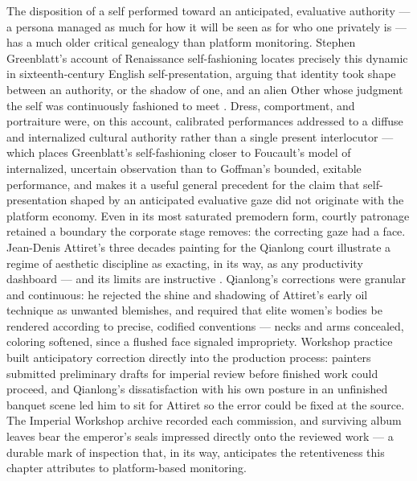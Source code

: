\documentclass[10pt]{article}
\begin{document}
The disposition of a self performed toward an anticipated, evaluative authority --- a persona managed as much for how it will be seen as for who one privately is --- has a much older critical genealogy than platform monitoring. Stephen Greenblatt's account of Renaissance self-fashioning locates precisely this dynamic in sixteenth-century English self-presentation, arguing that identity took shape between an authority, or the shadow of one, and an alien Other whose judgment the self was continuously fashioned to meet \cite{greenblatt}. Dress, comportment, and portraiture were, on this account, calibrated performances addressed to a diffuse and internalized cultural authority rather than a single present interlocutor --- which places Greenblatt's self-fashioning closer to Foucault's model of internalized, uncertain observation than to Goffman's bounded, exitable performance, and makes it a useful general precedent for the claim that self-presentation shaped by an anticipated evaluative gaze did not originate with the platform economy. Even in its most saturated premodern form, courtly patronage retained a boundary the corporate stage removes: the correcting gaze had a face. Jean-Denis Attiret's three decades painting for the Qianlong court illustrate a regime of aesthetic discipline as exacting, in its way, as any productivity dashboard --- and its limits are instructive \cite{kleutghen}. Qianlong's corrections were granular and continuous: he rejected the shine and shadowing of Attiret's early oil technique as unwanted blemishes, and required that elite women's bodies be rendered according to precise, codified conventions --- necks and arms concealed, coloring softened, since a flushed face signaled impropriety. Workshop practice built anticipatory correction directly into the production process: painters submitted preliminary drafts for imperial review before finished work could proceed, and Qianlong's dissatisfaction with his own posture in an unfinished banquet scene led him to sit for Attiret so the error could be fixed at the source. The Imperial Workshop archive recorded each commission, and surviving album leaves bear the emperor's seals impressed directly onto the reviewed work --- a durable mark of inspection that, in its way, anticipates the retentiveness this chapter attributes to platform-based monitoring.
\end{document}
